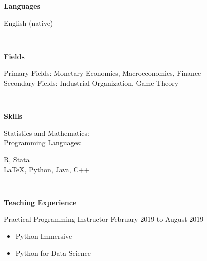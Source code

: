 \documentclass[final]{article}
\begin{document}
	\begin{minipage}[t]{.20\textwidth}
		\Large{\textbf{Languages}} \\
	\end{minipage}
	\begin{minipage}[t]{.80\textwidth}
		English (native)
	\end{minipage}\\

	\begin{minipage}[t]{.20\textwidth}
		\Large{\textbf{Fields}}\\
	\end{minipage}
	\begin{minipage}[t]{.80\textwidth}
		Primary Fields: Monetary Economics, Macroeconomics, Finance\\
		Secondary Fields: Industrial Organization, Game Theory 
	\end{minipage}\\

	\begin{minipage}[t]{.20\textwidth}
		\Large{\textbf{Skills}}\\
	\end{minipage}
	\begin{minipage}[t]{.20\textwidth}
		Statistics and Mathematics:\\
		Programming Languages: 
	\end{minipage}
	\begin{minipage}[t]{.40\textwidth}
		R, Stata\\
		\LaTeX, Python, Java, C++
		
	\end{minipage}\\
	
	\begin{minipage}[t]{.20\textwidth}
		\Large{\textbf{Teaching \mbox{Experience}}}\\
	\end{minipage}
	\begin{minipage}[t]{.80\textwidth}
		Practical Programming Instructor \hfill February 2019 to August 2019
		\begin{itemize}
			\item Python Immersive 
			\item Python for Data Science
		\end{itemize}
	\end{minipage}\\
\end{document}
